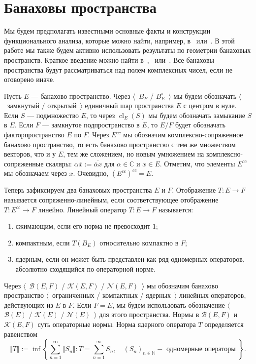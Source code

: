 \section{Банаховы пространства}\label{SectionBanachSpaces}

Мы будем предполагать известными основные факты и конструкции функционального
анализа, которые можно найти, например, в~\cite{HelLectAndExOnFuncAn}
или~\cite{ConwACoursInFuncAn}. В этой работе мы также будем активно использовать
результаты по геометрии банаховых пространств. Краткое введение можно найти
в~\cite{CarothShortCourseBanSp},~\cite{KalAlbTopicsBanSpTh}
или~\cite{FabHabBanSpTh}. Все банаховы пространства будут рассматриваться над
полем комплексных чисел, если не оговорено иначе.

Пусть $E$ --- банахово пространство. Через $\langle$~$B_E$ /
$B_E^\circ$~$\rangle$ мы будем обозначать $\langle$~замкнутый /
открытый~$\rangle$ единичный шар пространства $E$ с центром в нуле. Если $S$ ---
подмножество $E$, то через $\operatorname{cl}_E(S)$ мы будем обозначать
замыкание $S$ в $E$. Если $F$ --- замкнутое подпространство в $E$, то $E/F$
будет обозначать факторпространство $E$ по $F$. Через $E^{cc}$ мы обозначим
комплексно-сопряженное банахово пространство, то есть банахово пространство с
тем же множеством векторов, что и у $E$, тем же сложением, но новым умножением
на комплексно-сопряженные скаляры: $\alpha
\overline{x}:=\overline{\overline{\alpha}x}$ для $\alpha\in\mathbb{C}$ и $x\in
E$. Отметим, что элементы $E^{cc}$ мы обозначаем через $\overline{x}$. Очевидно,
${(E^{cc})}^{cc}=E$.

Теперь зафиксируем два банаховых пространства $E$ и $F$. Отображение $T:E\to F$
называется сопряженно-линейным, если соответствующее отображение $T:E^{cc}\to F$
линейно. Линейный оператор $T:E\to F$ называется:
\begin{enumerate}[label = (\roman*)]
    \item сжимающим, если его норма не превосходит $1$;

    \item компактным, если $T(B_E)$ относительно компактно в $F$;

    \item ядерным, если он может быть представлен как ряд одномерных операторов,
    абсолютно сходящийся по операторной норме.
\end{enumerate}

Через $\langle$~$\mathcal{B}(E,F)$ / $\mathcal{K}(E,F)$ /
$\mathcal{N}(E,F)$~$\rangle$ мы обозначим банахово пространство
$\langle$~ограниченных / компактных / ядерных~$\rangle$ линейных операторов,
действующих из $E$ в $F$. Если $F=E$, мы будем использовать обозначение
$\langle$~$\mathcal{B}(E)$ / $\mathcal{K}(E)$ / $\mathcal{N}(E)$~$\rangle$ для
этого пространства. Нормы в $\mathcal{B}(E,F)$ и $\mathcal{K}(E,F)$ суть
операторные нормы. Норма ядерного оператора $T$ определяется равенством
$$
\Vert T\Vert
:=\inf\left \{
    \sum_{n=1}^\infty\Vert S_n\Vert
    :T=\sum_{n=1}^\infty S_n,
    \quad {(S_n)}_{n\in\mathbb{N}} - \mbox{ одномерные операторы }
\right \}.
$$

